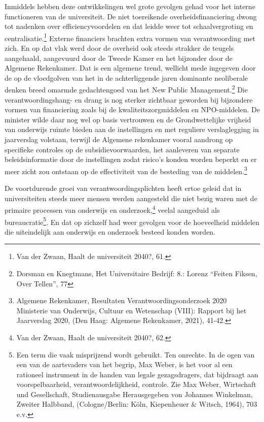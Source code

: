\documentclass[empirical, authordate, ]{new-jote-article}
\begin{document}
	Inmiddels hebben deze ontwikkelingen wel grote gevolgen gehad voor het interne functioneren van de universiteit. De niet toereikende overheidsfinanciering dwong tot nadenken over efficiencyvoordelen en dat leidde weer tot schaalvergroting en centralisatie.\footnote{Van der Zwaan, Haalt de universiteit 2040?, 61. } Externe financiers brachten extra vormen van verantwoording met zich. En op dat vlak werd door de overheid ook steeds strakker de teugels aangehaald, aangevuurd door de Tweede Kamer en het bijzonder door de Algemene Rekenkamer. Dat is een algemene trend, wellicht mede ingegeven door de op de vloedgolven van het in de achterliggende jaren dominante neoliberale denken breed omarmde gedachtengoed van het New Public Management.\footnote{Dorsman en Knegtmans, Het Universitaire Bedrijf: 8.: Lorenz “Feiten Fiksen, Over Tellen”, 77} Die verantwoordingshang- en drang is nog sterker zichtbaar geworden bij bijzondere vormen van financiering zoals bij de kwaliteitszorgmiddelen en NPO-middelen. De minister wilde daar nog wel op basis vertrouwen en de Grondwettelijke vrijheid van onderwijs ruimte bieden aan de instellingen en met reguliere verslaglegging in jaarverslag volstaan, terwijl de Algemene rekenkamer vooral aandrong op specifieke controles op de subsidievoorwaarden, het aanleveren van separate beleidsinformatie door de instellingen zodat risico's konden worden beperkt en er meer zicht zou ontstaan op de effectiviteit van de besteding van de middelen.\footnote{Algemene Rekenkamer, Resultaten Verantwoordingsonderzoek 2020 Ministerie van Onderwijs, Cultuur en Wetenschap (VIII): Rapport bij het Jaarverslag 2020, (Den Haag: Algemene Rekenkamer, 2021), 41-42.}



	De voortdurende groei van verantwoordingsplichten heeft ertoe geleid dat in universiteiten steeds meer mensen werden aangesteld die niet bezig waren met de primaire processen van onderwijs en onderzoek,\footnote{Van der Zwaan, Haalt de universiteit 2040?, 62.} veelal aangeduid als bureaucratie\footnote{Een term die vaak misprijzend wordt gebruikt. Ten onrechte. In de ogen van een van de aartsvaders van het begrip, Max Weber, is het voor al een rationeel instrument in de handen van legale gezagsdragers, dat bijdraagt aan voorspelbaarheid, verantwoordelijkheid, controle. Zie Max Weber, Wirtschaft und Gesellschaft, Studienausgabe Herausgegeben von Johannes Winkelman, Zweiter Halbband, (Cologne/Berlin: Köln, Kiepenheuer \& Witsch, 1964), 703 e.v.}. En dat op zichzelf had weer gevolgen voor de hoeveelheid middelen die uiteindelijk aan onderwijs en onderzoek besteed konden worden.
\end{document}
